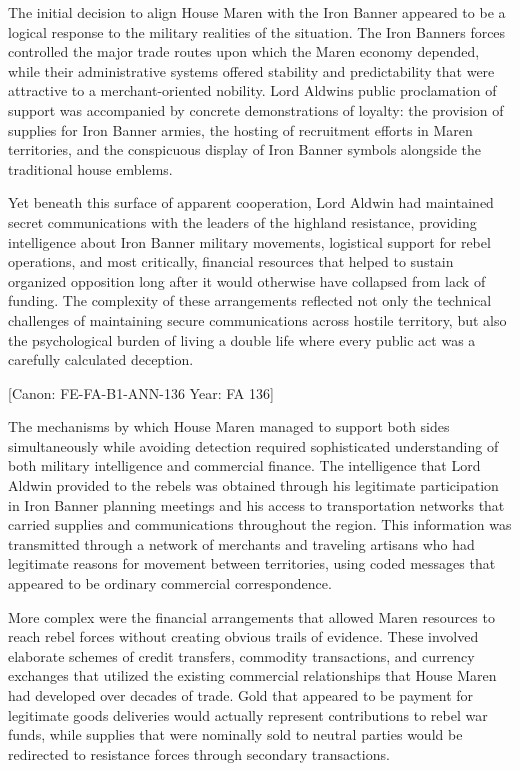 The initial decision to align House Maren with the Iron Banner appeared
to be a logical response to the military realities of the situation. The
Iron Banner\textquotesingle s forces controlled the major trade routes
upon which the Maren economy depended, while their administrative
systems offered stability and predictability that were attractive to a
merchant-oriented nobility. Lord Aldwin\textquotesingle s public
proclamation of support was accompanied by concrete demonstrations of
loyalty: the provision of supplies for Iron Banner armies, the hosting
of recruitment efforts in Maren territories, and the conspicuous display
of Iron Banner symbols alongside the traditional house emblems.

Yet beneath this surface of apparent cooperation, Lord Aldwin had
maintained secret communications with the leaders of the highland
resistance, providing intelligence about Iron Banner military movements,
logistical support for rebel operations, and most critically, financial
resources that helped to sustain organized opposition long after it
would otherwise have collapsed from lack of funding. The complexity of
these arrangements reflected not only the technical challenges of
maintaining secure communications across hostile territory, but also the
psychological burden of living a double life where every public act was
a carefully calculated deception.

{[}Canon: FE-FA-B1-ANN-136 \textbar{} Year: FA 136{]}

The mechanisms by which House Maren managed to support both sides
simultaneously while avoiding detection required sophisticated
understanding of both military intelligence and commercial finance. The
intelligence that Lord Aldwin provided to the rebels was obtained
through his legitimate participation in Iron Banner planning meetings
and his access to transportation networks that carried supplies and
communications throughout the region. This information was transmitted
through a network of merchants and traveling artisans who had legitimate
reasons for movement between territories, using coded messages that
appeared to be ordinary commercial correspondence.

More complex were the financial arrangements that allowed Maren
resources to reach rebel forces without creating obvious trails of
evidence. These involved elaborate schemes of credit transfers,
commodity transactions, and currency exchanges that utilized the
existing commercial relationships that House Maren had developed over
decades of trade. Gold that appeared to be payment for legitimate goods
deliveries would actually represent contributions to rebel war funds,
while supplies that were nominally sold to neutral parties would be
redirected to resistance forces through secondary transactions.

